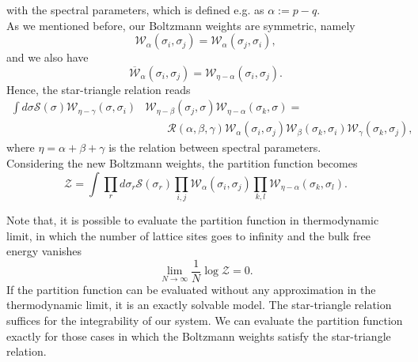 \documentclass[a4paper,11pt]{article}%
\numberwithin{equation}{section}
\begin{document}
with the spectral parameters, which is defined e.g. as $\alpha:=p-q$. \\As we mentioned before, our Boltzmann weights are symmetric, namely
\begin{equation}
\mathcal{W}_\alpha(\sigma_i,\sigma_j)=\mathcal{W}_\alpha(\sigma_j,\sigma_i), \end{equation}
and we also have 
\begin{equation}
\overline{\mathcal{W}}_ \alpha (\sigma_i,\sigma_j)=\mathcal{W}_{ \eta - \alpha }(\sigma_i,\sigma_j).
\end{equation}
Hence, the star-triangle relation reads
\begin{align}\nonumber\label{str}
     \int d \sigma \mathcal{S}( \sigma ) \mathcal{W}_{\eta-\gamma}(\sigma,\sigma_i)& \mathcal{W}_{\eta - \beta}( \sigma _{j}, \sigma) \mathcal{W}_{ \eta - \alpha}( \sigma_{k} , \sigma)=\\
    & \qquad \mathcal{R}(\alpha,\beta,\gamma)\mathcal{W}_{ \alpha }( \sigma _{i}, \sigma_{j})\mathcal{W}_{ \beta}( \sigma _{k}, \sigma_{i})\mathcal{W}_{ \gamma}( \sigma _{k}, \sigma_{j}),
\end{align}
where $\eta=\alpha+\beta+\gamma$ is the relation between spectral parameters.\\Considering the new Boltzmann weights, the partition function becomes
\begin{equation}\label{P-F}
      \mathcal{Z}=\int \prod_r d\sigma_r   \mathcal{S}(  \sigma _{r} ) \prod_{i,j}  \mathcal{W}_ {\alpha} (  \sigma _{i} ,  \sigma _{j} ) \prod_{k,l}  \mathcal{W}_ {\eta-\alpha }  (  \sigma _{k} ,  \sigma _{l} ).  
\end{equation}
 
Note that, it is possible to evaluate the partition function in thermodynamic limit, in which the number
of lattice sites goes to infinity and the bulk free energy  vanishes
\begin{equation}
    \lim_{N\rightarrow\infty} \frac{1}{N}\log  \mathcal{Z}=0.
\end{equation}
If the partition function can be evaluated without any approximation in the thermodynamic limit, it is an exactly solvable model. The star-triangle relation suffices for the integrability of our system. We can evaluate the partition function exactly for those cases in which the Boltzmann weights satisfy the star-triangle relation.





\end{document}
